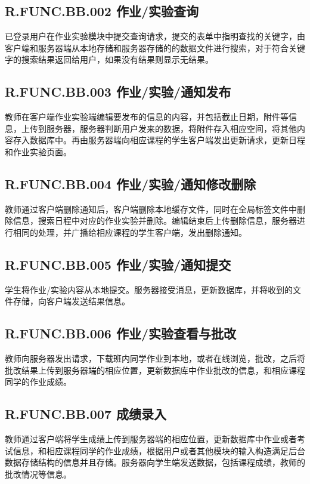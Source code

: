 \subsection{R.FUNC.BB.002   作业/实验查询}
已登录用户在作业实验模块中提交查询请求，提交的表单中指明查找的关键字，由客户端和服务器端从本地存储和服务器存储的的数据文件进行搜索，对于符合关键字的搜索结果返回给用户，如果没有结果则显示无结果。

\subsection{R.FUNC.BB.003   作业/实验/通知发布}
教师在客户端作业实验端编辑要发布的信息的内容，并包括截止日期，附件等信息，上传到服务器，服务器判断用户发来的数据，将附件存入相应空间，将其他内容存入数据库中。再由服务器端向相应课程的学生客户端发出更新请求，更新日程和作业实验页面。

\subsection{R.FUNC.BB.004   作业/实验/通知修改删除}
教师通过客户端删除通知后，客户端删除本地缓存文件，同时在全局标签文件中删除信息，搜索日程中对应的作业实验并删除。编辑结束后上传删除信息，服务器进行相同的处理，并广播给相应课程的学生客户端，发出删除通知。

\subsection{R.FUNC.BB.005   作业/实验/通知提交}
学生将作业/实验内容从本地提交。服务器接受消息，更新数据库，并将收到的文件存储，向客户端发送结果信息。

\subsection{R.FUNC.BB.006   作业/实验查看与批改}
教师向服务器发出请求，下载班内同学作业到本地，或者在线浏览，批改，之后将批改结果上传到服务器端的相应位置，更新数据库中作业批改的信息，和相应课程同学的作业成绩。

\subsection{R.FUNC.BB.007   成绩录入}
教师通过客户端将学生成绩上传到服务器端的相应位置，更新数据库中作业或者考试信息，和相应课程同学的作业成绩，根据用户或者其他模块的输入构造满足后台数据存储结构的信息并且存储。服务器向学生端发送数据，包括课程成绩，教师的批改情况等信息。

